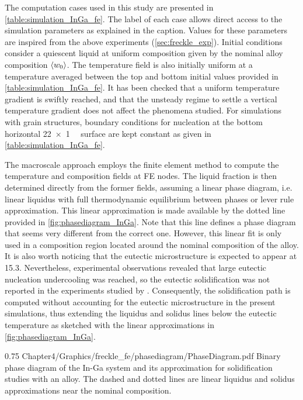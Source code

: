 The computation cases used in this study are presented 
in \cref{table:simulation_InGa_fe}. The label of each case allows direct access to the simulation parameters as explained in the caption. Values for 
these parameters are inspired from the above experiments (\cref{sec:freckle_exp}). Initial conditions consider a quiescent 
liquid at uniform composition given by the nominal alloy composition $\left \langle {w}_0 \right \rangle$. The temperature field is also initially uniform 
at a temperature averaged between the top and bottom initial values provided in \cref{table:simulation_InGa_fe}. It has been checked that a uniform 
temperature gradient is swiftly reached, and that the unsteady regime to settle a vertical temperature gradient does not affect 
the phenomena studied. For simulations with grain structures, boundary conditions for nucleation at the bottom horizontal \SI{22 x 1}{\milli \uarea} 
surface are kept constant as given in \cref{table:simulation_InGa_fe}.

The macroscale approach employs the finite element method to compute the temperature and composition fields at FE nodes. 
The liquid fraction is then determined directly from the former fields, assuming a linear phase diagram, i.e. linear liquidus 
with full thermodynamic equilibrium between phases or lever rule approximation. This linear approximation is made available by 
the dotted line provided in \cref{fig:phasediagram_InGa}. Note that this line defines a phase diagram that seems very different from the correct one. 
However, this linear fit is only used in a composition region located around the nominal composition of the alloy. It is also worth 
noticing that the eutectic microstructure is expected to appear at \SI{15.3}{\udegC}. Nevertheless, experimental observations revealed that large 
eutectic nucleation undercooling was reached, so the eutectic solidification was not reported in the experiments studied by 
\citet{shevchenko_chimney_2013}. Consequently, the solidification path is computed without accounting for the eutectic microstructure 
in the present simulations, thus extending the liquidus and solidus lines below the eutectic temperature as sketched with the linear 
approximations in \cref{fig:phasediagram_InGa}.

\begin{figureth}
{0.75}
{Chapter4/Graphics/freckle_fe/phasediagram/PhaseDiagram.pdf}
{Binary phase diagram of the In-Ga system \citep{andersson_thermo-calc_2002,tcbin_tcbin:_2006} and 
its approximation for solidification studies with an  alloy. 
The dashed and dotted lines are linear liquidus and solidus approximations near the nominal composition.}
\label{fig:phasediagram_InGa}
\end{figureth}

